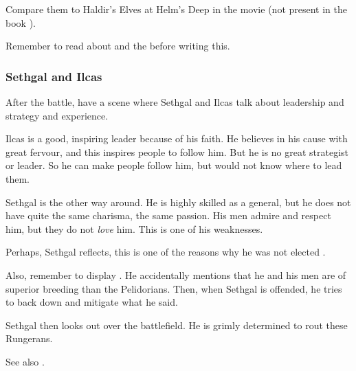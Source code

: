 Compare them to Haldir's Elves at Helm's Deep in the movie \cite{Movie:LordoftheRings:II} (not present in the book \cite{JRRTolkien:LordoftheRings:II}). 

Remember to read about  and the \nycans{} before writing this. 





\subsubsection{Sethgal and Ilcas}
After the battle, have a scene where Sethgal and Ilcas talk about leadership and strategy and experience. 

Ilcas is a good, inspiring leader because of his faith. 
He believes in his cause with great fervour, and this inspires people to follow him.
But he is no great strategist or leader. 
So he can make people follow him, but would not know where to lead them. 

Sethgal is the other way around. 
He is highly skilled as a general, but he does not have quite the same charisma, the same passion. 
His men admire and respect him, but they do not \emph{love} him. 
This is one of his weaknesses. 

Perhaps, Sethgal reflects, this is one of the reasons why he was not elected \rayuth{}. 

Also, remember to display . 
He accidentally mentions that he and his men are of superior breeding than the Pelidorians. 
Then, when Sethgal is offended, he tries to back down and mitigate what he said. 

Sethgal then looks out over the battlefield.
He is grimly determined to rout these Rungerans. 


See also \cite{RobertEHoward:KingsoftheNight}. 





